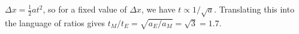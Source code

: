 $\Delta x=\frac{1}{2}at^2$, so for a fixed value of $\Delta x$, we have $t\propto 1/\sqrt{a}$.
Translating this into the language of ratios gives $t_M/t_E=\sqrt{a_E/a_M}=\sqrt{3}=1.7$.
